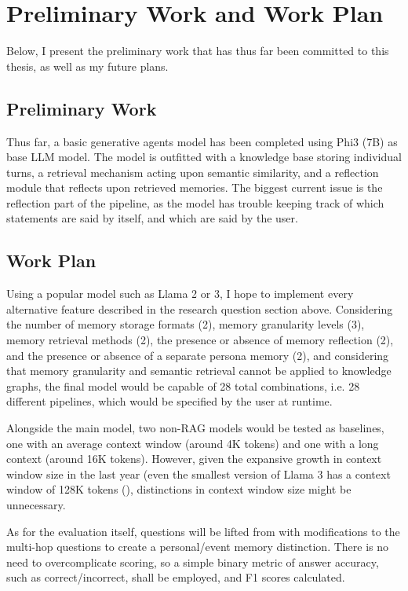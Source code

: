 \section{Preliminary Work and Work Plan}

Below, I present the preliminary work that has thus far been committed to this thesis, as well as my future plans.

\subsection{Preliminary Work}

Thus far, a basic generative agents model has been completed using Phi3 (7B) as base LLM model. The model is outfitted with a knowledge base storing individual turns, a retrieval mechanism acting upon semantic similarity, and a reflection module that reflects upon retrieved memories. The biggest current issue is the reflection part of the pipeline, as the model has trouble keeping track of which statements are said by itself, and which are said by the user.

\subsection{Work Plan}

Using a popular model such as Llama 2 or 3, I hope to implement every alternative feature described in the research question section above. Considering the number of memory storage formats (2), memory granularity levels (3), memory retrieval methods (2), the presence or absence of memory reflection (2), and the presence or absence of a separate persona memory (2), and considering that memory granularity and semantic retrieval cannot be applied to knowledge graphs, the final model would be capable of 28 total combinations, i.e. 28 different pipelines, which would be specified by the user at runtime.

Alongside the main model, two non-RAG models would be tested as baselines, one with an average context window (around 4K tokens) and one with a long context (around 16K tokens). However, given the expansive growth in context window size in the last year (even the smallest version of Llama 3 has a context window of 128K tokens (\cite{Huggingface_Llama3_8B}), distinctions in context window size might be unnecessary. 

As for the evaluation itself, questions will be lifted from \cite{Maharana2024} with modifications to the multi-hop questions to create a personal/event memory distinction. There is no need to overcomplicate scoring, so a simple binary metric of answer accuracy, such as correct/incorrect, shall be employed, and F1 scores calculated. 